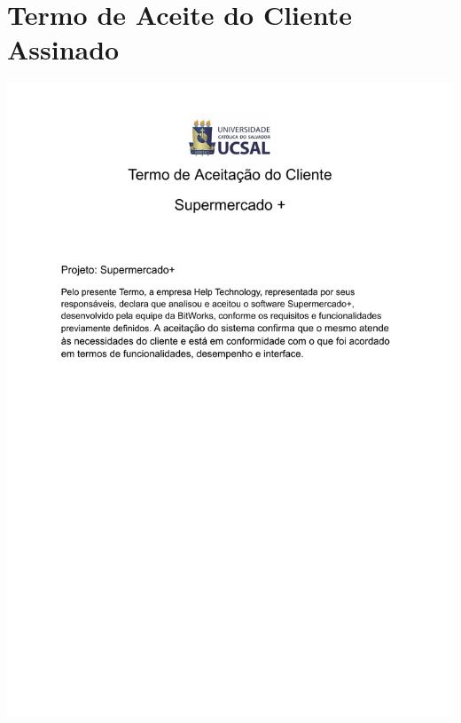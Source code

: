 \documentclass[12pt,oneside,a4paper,article]{abntex2}
\begin{document}
    \section{Termo de Aceite do Cliente Assinado}
    \includegraphics[page=1, width=\textwidth]{imagens-template/arquivos/Termo de aceite.docx.pdf}
    \newpage
\end{document}
